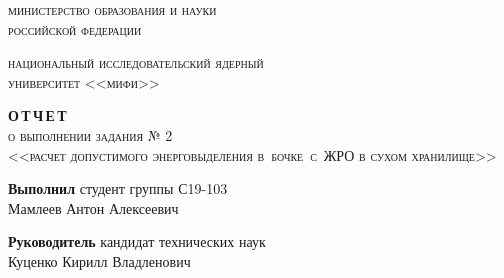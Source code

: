 
\usepackage{listings} %
\usepackage{color} %




\newcommand{\signfield}[2]{%
	\rule{#1}{0.1pt}\hspace{-#1}
	\raisebox{-1.1ex}{\parbox[t]{#1}{\centering\scriptsize{#2}}}
}


\thispagestyle{empty}
\begin{center}
	\large
	{\scshape министерство образования и науки\\российской федерации}
	\vspace{1ex}
	
	{\scshape национальный исследовательский ядерный\\университет <<мифи>>}
	\vspace{4 cm}
	
	\Large
	{\scshape \textbf{О\,Т\,Ч\,Е\,Т}\\о выполнении задания № 2\\<<расчет допустимого энерговыделения в~бочке~с~ЖРО в сухом хранилище>>}
\end{center}

\vspace{4cm}
\begin{flushright}
	\textbf{Выполнил} студент группы С19-103\\
	Мамлеев Антон Алексеевич
	
	\vspace{3 ex}
	\textbf{Руководитель} кандидат технических наук\\
	Куценко Кирилл Владленович
\end{flushright}



